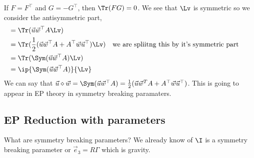 
\noindent
If $F = F^\top$ and $G = -G^\top$, then $\Tr(FG) = 0$. We see that $\Lv$ is symmetric so we consider the antisymmetric part,
\begin{align*}
  &= \Tr(\vec u\vec w^\top A \Lv )\\
  &= \Tr (\frac{1}{2}(\vec u\vec w^\top A + A^\top \vec w\vec u^\top)\Lv ) && \text{we are spliitng this by it's symmetric part} \\
  &= \Tr(\Sym(\vec u\vec w^\top A)\Lv) \\
  &= \ip{\Sym(\vec u\vec w^\top A)}{\Lv}
\end{align*}
We can say that $\vec u \diamond \vec w = \Sym(\vec u\vec w^\top A) = \frac{1}{2}(\vec u\vec w^T A + A^\top \vec w\vec u^\top)$. This is going to appear in EP theory in symmetry breaking paramaters.

\subsection{EP Reduction with parameters}

What are symmetry breaking parameters? We already know of $\I$ is a symmetry breaking parameter or $\vec e_3 = R\Gamma$ which is gravity.\\


